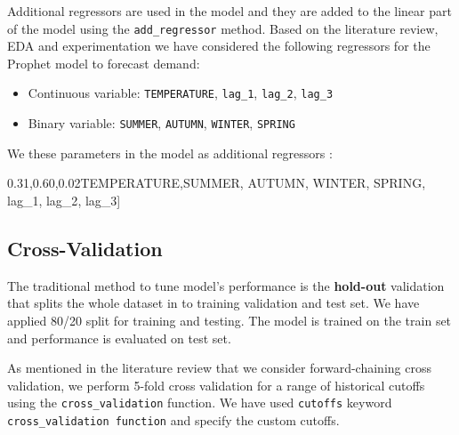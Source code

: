 \documentclass[mstat,12pt]{unswthesis}
\newenvironment{Shaded}{\begin{snugshade}}{\end{snugshade}}
\newcommand{\NormalTok}[1]{#1}
\newcommand{\StringTok}[1]{\textcolor[rgb]{0.31,0.60,0.02}{#1}}
\begin{document}
Additional regressors are used in the model and they are added to the
linear part of the model using the \texttt{add\_regressor} method. Based
on the literature review, EDA and experimentation we have considered the
following regressors for the Prophet model to forecast demand:

\begin{itemize}
\item
  Continuous variable: \texttt{TEMPERATURE}, \texttt{lag\_1},
  \texttt{lag\_2}, \texttt{lag\_3}
\item
  Binary variable: \texttt{SUMMER}, \texttt{AUTUMN}, \texttt{WINTER},
  \texttt{SPRING}
\end{itemize}

We these parameters in the model as additional regressors :

\begin{Shaded}
\begin{Highlighting}[]
\NormalTok{[}\StringTok{\textquotesingle{}TEMPERATURE\textquotesingle{}}\NormalTok{,}\StringTok{\textquotesingle{}SUMMER\textquotesingle{}}\NormalTok{, }\StringTok{\textquotesingle{}AUTUMN\textquotesingle{}}\NormalTok{, }\StringTok{\textquotesingle{}WINTER\textquotesingle{}}\NormalTok{, }\StringTok{\textquotesingle{}SPRING\textquotesingle{}}\NormalTok{, }
        \StringTok{\textquotesingle{}lag\_1\textquotesingle{}}\NormalTok{, }\StringTok{\textquotesingle{}lag\_2\textquotesingle{}}\NormalTok{, }\StringTok{\textquotesingle{}lag\_3\textquotesingle{}}\NormalTok{]}
\end{Highlighting}
\end{Shaded}

\hypertarget{cross-validation}{%
\subsection{Cross-Validation}\label{cross-validation}}

The traditional method to tune model's performance is the
\textbf{hold-out} validation that splits the whole dataset in to
training validation and test set. We have applied 80/20 split for
training and testing. The model is trained on the train set and
performance is evaluated on test set.

As mentioned in the literature review that we consider forward-chaining
cross validation, we perform 5-fold cross validation for a range of
historical cutoffs using the \texttt{cross\_validation} function. We
have used \texttt{cutoffs} keyword \texttt{cross\_validation\ function}
and specify the custom cutoffs.
\end{document}
